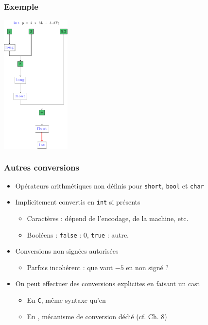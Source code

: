 \begin{frame}
\frametitle{Exemple}
\begin{center}
\includegraphics[height=7cm]{pics/conv.pdf}
\end{center}
\end{frame}

\begin{frame}
\frametitle{Autres conversions}
\begin{itemize}[<+->]
\item Opérateurs arithmétiques non définis pour \lstinline|short|, \lstinline|bool| et \lstinline|char|
\item Implicitement convertis en \lstinline|int| si présents 
	\begin{itemize}
	\item Caractères : dépend de l'encodage, de la machine, etc.
	\item Booléens : \lstinline|false| : $0$, \lstinline|true| : autre.
	\end{itemize}
\item Conversions non signées autorisées
	\begin{itemize}
	\item Parfois incohérent : que vaut $-5$ en non signé ?
	\end{itemize}
\item On peut effectuer des conversions explicites en faisant un cast
	\begin{itemize}
	\item En \texttt{C}, même syntaxe qu'en \java
	\item En \cpp, mécanisme de conversion dédié (cf. Ch. 8)
	\end{itemize}
\end{itemize}
\end{frame}


